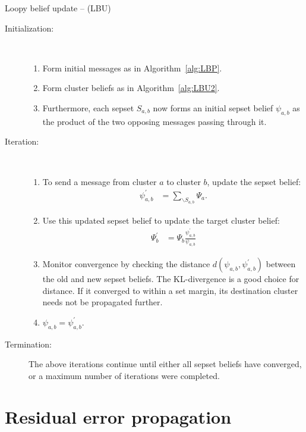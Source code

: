 \documentclass[oneside,english]{scrbook}
\begin{document}
\begin{algorithm}[!h]
  \caption{Loopy belief update -- (LBU)}  \label{alg:LBU}
  \begin{description}
  \item[Initialization:]~\\[-5mm]
    \begin{enumerate}
    \item Form initial messages as in Algorithm~\ref{alg:LBP}.
    \item Form cluster beliefs as in Algorithm~\ref{alg:LBU2}.
    \item Furthermore, each sepset $S_{a,b}$ now forms an initial
      sepset belief $\psi_{a,b}$ as the product of the two opposing
      messages passing through it.
    \end{enumerate}
  \item[Iteration:]~\\[-5mm]
    \begin{enumerate}
    \item To send a message from cluster $a$ to cluster $b$, update the sepset belief:
      \begin{align}
        \psi^{'}_{a,b}
        &= \sum_{\backslash S_{a,b}} \Psi_a. \nonumber
      \end{align}
    \item Use this updated sepset belief to update the target cluster belief:
      \begin{align}
        \Psi^{'}_b & = \Psi_b\frac{\psi^{'}_{a,b}}{\psi_{a,b}} \nonumber
      \end{align}
    \item Monitor convergence by checking the distance
      $d(\psi_{a,b},\psi^{'}_{a,b})$ between the old and new sepset beliefs. The
      KL-divergence is a good choice for distance. If it
      converged to within a set margin, its destination cluster needs
      not be propagated further.
    \item $\psi_{a,b} = \psi^{'}_{a,b}.$
    \end{enumerate}
  \item[Termination:] The above iterations continue until either all
    sepset beliefs have converged, or a maximum number of iterations
    were completed.
  \end{description}
\end{algorithm}

\FloatBarrier
\section{Residual error propagation}
\end{document}
